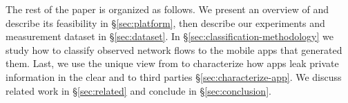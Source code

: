 
The rest of the paper is organized as follows. 
We present an overview of \platname and describe its feasibility in \S\ref{sec:platform}, then describe our experiments and measurement dataset in \S\ref{sec:dataset}.
In  \S\ref{sec:classification-methodology} we study how to classify observed network flows to the mobile apps that generated them. Last, we use the 
unique view from \platname to characterize how apps leak private information in the clear and to third parties \S\ref{sec:characterize-app}. 
We discuss related work in \S\ref{sec:related} and conclude in \S\ref{sec:conclusion}.

